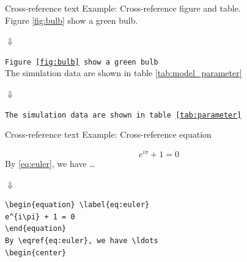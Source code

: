 \documentclass{beamer}
\begin{document}
\begin{darkframes}

\begin{frame}[fragile]{Cross-reference text}
		\alert{Example:} Cross-reference figure and table.\\
		
Figure \ref{fig:bulb} show a green bulb. \begin{center}
	$\Downarrow$
\end{center} \texttt{Figure \ref{fig:bulb} show a green bulb} \\

The simulation data are shown in table \ref{tab:model_parameter} \begin{center}
$\Downarrow$
\end{center} \texttt{The simulation data are shown in table \ref{tab:parameter}} \\


	
\end{frame}

\begin{frame}[fragile]{Cross-reference text}
	\alert{Example: Cross-reference equation}
	
	\begin{equation} \label{eq:euler}
	e^{i\pi} + 1 = 0
	\end{equation}
	By \eqref{eq:euler}, we have \ldots
	\begin{center}
		$\Downarrow$
	\end{center}
\begin{verbatim}
\begin{equation} \label{eq:euler}
e^{i\pi} + 1 = 0
\end{equation}
By \eqref{eq:euler}, we have \ldots
\begin{center}
\end{verbatim}
\end{frame}


\end{darkframes}
\end{document}
